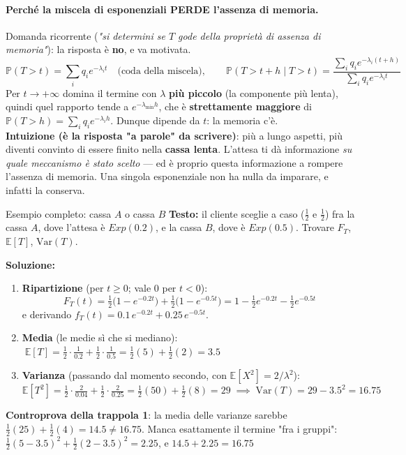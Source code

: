 \documentclass[12pt]{extarticle} %
\begin{document}
\paragraph{Perché la miscela di esponenziali PERDE l'assenza di memoria.} Domanda ricorrente (\emph{"si determini se $T$ gode della proprietà di assenza di memoria"}): la risposta è \textbf{no}, e va motivata.
$$ \mathbb{P}(T > t) = \sum_i q_i e^{-\lambda_i t} \quad\text{(coda della miscela)}, \qquad \mathbb{P}(T > t+h \mid T > t) = \frac{\sum_i q_i e^{-\lambda_i (t+h)}}{\sum_i q_i e^{-\lambda_i t}} $$
Per $t \to +\infty$ domina il termine con $\lambda$ \textbf{più piccolo} (la componente più lenta), quindi quel rapporto tende a $e^{-\lambda_{\min} h}$, che è \textbf{strettamente maggiore} di $\mathbb{P}(T > h) = \sum_i q_i e^{-\lambda_i h}$. Dunque dipende da $t$: la memoria c'è. \\
{\footnotesize \textbf{Intuizione (è la risposta "a parole" da scrivere)}: più a lungo aspetti, più diventi convinto di essere finito nella \textbf{cassa lenta}. L'attesa ti dà informazione \emph{su quale meccanismo è stato scelto} — ed è proprio questa informazione a rompere l'assenza di memoria. Una singola esponenziale non ha nulla da imparare, e infatti la conserva.}

\begin{eserciziobox}{{Esempio completo: cassa $A$ o cassa $B$}}
\textbf{Testo:} il cliente sceglie a caso ($\frac12$ e $\frac12$) fra la cassa $A$, dove l'attesa è $Exp(0.2)$, e la cassa $B$, dove è $Exp(0.5)$. Trovare $F_T$, $\mathbb{E}[T]$, $\mathrm{Var}(T)$.
\par\textbf{Soluzione:}
\begin{enumerate}
    \item \textbf{Ripartizione} (per $t \ge 0$; vale $0$ per $t<0$):
    $$ F_T(t) = \tfrac12\big(1 - e^{-0.2t}\big) + \tfrac12\big(1 - e^{-0.5t}\big) = 1 - \tfrac12 e^{-0.2t} - \tfrac12 e^{-0.5t} $$
    e derivando $f_T(t) = 0.1\,e^{-0.2t} + 0.25\,e^{-0.5t}$.
    \item \textbf{Media} (le medie sì che si mediano): $\;\mathbb{E}[T] = \tfrac12 \cdot \tfrac{1}{0.2} + \tfrac12 \cdot \tfrac{1}{0.5} = \tfrac12(5) + \tfrac12(2) = \mathbf{3.5}$
    \item \textbf{Varianza} (passando dal momento secondo, con $\mathbb{E}[X^2] = 2/\lambda^2$):
    $$ \mathbb{E}[T^2] = \tfrac12 \cdot \tfrac{2}{0.04} + \tfrac12 \cdot \tfrac{2}{0.25} = \tfrac12(50) + \tfrac12(8) = 29 \;\implies\; \mathrm{Var}(T) = 29 - 3.5^2 = \mathbf{16.75} $$
\end{enumerate}
{\footnotesize \textbf{Controprova della trappola 1}: la media delle varianze sarebbe $\frac12(25) + \frac12(4) = 14.5 \ne 16.75$. Manca esattamente il termine "fra i gruppi": $\frac12(5-3.5)^2 + \frac12(2-3.5)^2 = 2.25$, e $14.5 + 2.25 = 16.75$ \checkmark}
\end{eserciziobox}
\end{document}
